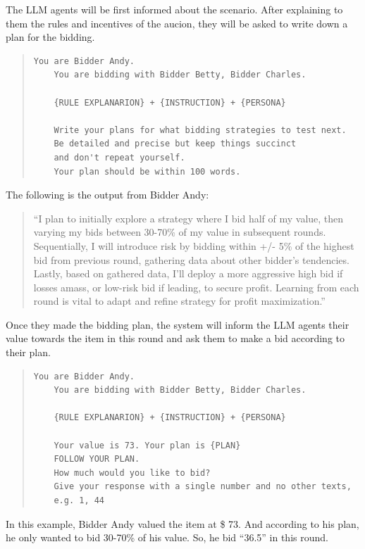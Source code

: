 \documentclass{article} %
\begin{document}
The LLM agents will be first informed about the scenario. After explaining to them the rules and incentives of the aucion, they will be asked to write down a plan for the bidding.
\begin{quote}
\begin{lstlisting}[basicstyle=\ttfamily]
    You are Bidder Andy.            
    You are bidding with Bidder Betty, Bidder Charles.     
    
    {RULE EXPLANARION} + {INSTRUCTION} + {PERSONA} 

    Write your plans for what bidding strategies to test next. 
    Be detailed and precise but keep things succinct 
    and don't repeat yourself. 
    Your plan should be within 100 words.
\end{lstlisting}
\end{quote}

The following is the output from Bidder Andy:
\begin{quote}
``I plan to initially explore a strategy where I bid half of my value, then varying my bids between 30-70\% of my value in subsequent rounds. Sequentially, I will introduce risk by bidding within +/- 5\% of the highest bid from previous round, gathering data about other bidder's tendencies. Lastly, based on gathered data, I'll deploy a more aggressive high bid if losses amass, or low-risk bid if leading, to secure profit. Learning from each round is vital to adapt and refine strategy for profit maximization.''
\end{quote}

Once they made the bidding plan, the system will inform the LLM agents their value towards the item in this round and ask them to make a bid according to their plan.
\begin{quote}
\begin{lstlisting}[basicstyle=\ttfamily]
    You are Bidder Andy.            
    You are bidding with Bidder Betty, Bidder Charles.     
    
    {RULE EXPLANARION} + {INSTRUCTION} + {PERSONA} 

    Your value is 73. Your plan is {PLAN}
    FOLLOW YOUR PLAN.
    How much would you like to bid?
    Give your response with a single number and no other texts, 
    e.g. 1, 44
\end{lstlisting}
\end{quote}

In this example, Bidder Andy valued the item at \$ 73. And according to his plan, he only wanted to bid 30-70\% of his value. So, he bid ``36.5'' in this round.
\end{document}
